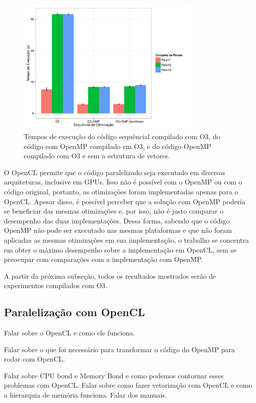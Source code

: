 \documentclass[12pt]{article}
\begin{document}
\begin{figure}[H]
\centering
\includegraphics[width=0.8\textwidth]{omp.pdf}
\caption{Tempos de execução do código sequêncial compilado com O3, do código com OpenMP compilado em O3, e do código OpenMP compilado com O3 e sem a estrutura de vetores.}
\label{fgomp}
\end{figure}

O OpenCL permite que o código paralelizado seja executado em diversas arquiteturas, inclusive em GPUs. Isso não é possível com o OpenMP ou com o código original, portanto, as otimizações foram implementadas apenas para o OpenCL. Apesar disso, é possível perceber que a solução com OpenMP poderia se beneficiar das mesmas otimizações e, por isso, não é justo comparar o desempenho das duas implementações. Dessa forma, sabendo que o código OpenMP não pode ser executado nas mesmas plataformas e que não foram aplicadas as mesmas otimizações em sua implementação, o trabalho se concentra em obter o máximo desempenho sobre a implementação em OpenCL, sem se preocupar com comparações com a implementação com OpenMP.

A partir da próxima subseção, todos os resultados mostrados serão de experimentos compilados com O3.

\subsection{Paralelização com OpenCL} \label{ocl}

Falar sobre o OpenCL e como ele funciona.

Falar sobre o que foi necessário para transformar o código do OpenMP para rodar com OpenCL.

Falar sobre CPU bond e Memory Bond e como podemos contornar esses problemas com OpenCL. Falar sobre como fazer vetorização com OpenCL e como a hierarquia de memória funciona. Falar dos manuais.
\end{document}
